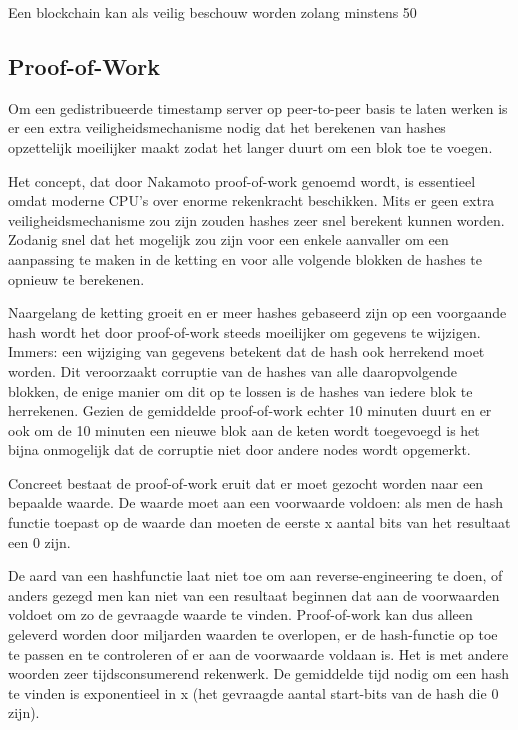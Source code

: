 	Een blockchain kan als veilig beschouw worden zolang minstens 50%
			
	\subsection{Proof-of-Work}
	Om een gedistribueerde timestamp server op peer-to-peer basis te laten werken is er een extra veiligheidsmechanisme nodig dat het berekenen van hashes opzettelijk moeilijker maakt zodat het langer duurt om een blok toe te voegen. 
	
	Het concept, dat door Nakamoto proof-of-work genoemd wordt, is essentieel omdat moderne CPU’s over enorme rekenkracht beschikken. Mits er geen extra veiligheidsmechanisme zou zijn zouden hashes zeer snel berekent kunnen worden. Zodanig snel dat het mogelijk zou zijn voor een enkele aanvaller om een aanpassing te maken in de ketting en voor alle volgende blokken de hashes te opnieuw te berekenen. 
	
	Naargelang de ketting groeit en er meer hashes gebaseerd zijn op een voorgaande hash wordt het door proof-of-work steeds moeilijker om gegevens te wijzigen. Immers: een wijziging van gegevens betekent dat de hash ook herrekend moet worden. Dit veroorzaakt corruptie van de hashes van alle daaropvolgende blokken, de enige manier om dit op te lossen is de hashes van iedere blok te herrekenen. 
	Gezien de gemiddelde proof-of-work echter 10 minuten duurt en er ook om de 10 minuten een nieuwe blok aan de keten wordt toegevoegd is het bijna onmogelijk dat de corruptie niet door andere nodes wordt opgemerkt.
	
	Concreet bestaat de proof-of-work eruit dat er moet gezocht worden naar een bepaalde waarde. De waarde moet aan een voorwaarde voldoen: als men de hash functie toepast op de waarde dan moeten de eerste x aantal bits van het resultaat een 0 zijn. 
	
	De aard van een hashfunctie laat niet toe om aan reverse-engineering te doen, of anders gezegd men kan niet van een resultaat beginnen dat aan de voorwaarden voldoet om zo de gevraagde waarde te vinden. Proof-of-work kan dus alleen geleverd worden door miljarden waarden te overlopen, er de hash-functie op toe te passen en te controleren of er aan de voorwaarde voldaan is. Het is met andere woorden zeer tijdsconsumerend rekenwerk. De gemiddelde tijd nodig om een hash te vinden is exponentieel in x (het gevraagde aantal start-bits van de hash die 0 zijn).
	
